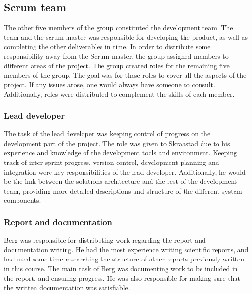 \subsection{Scrum team}
\label{subsec:process_and_methodology-project_organization-scrum_team}

The other five members of the group constituted the development team. The team and the scrum master was responsible for developing the product, as well as completing the other deliverables in time. In order to distribute some responsibility away from the Scrum master, the group assigned members to different areas of the project. The group created roles for the remaining five members of the group. The goal was for these roles to cover all the aspects of the project. If any issues arose, one would always have someone to consult. Additionally, roles were distributed to complement the skills of each member.

\subsubsection{Lead developer}
\label{subsec:process_and_methodology-project_organization-lead_developer}

The task of the lead developer was keeping control of progress on the development part of the project. The role was given to Skraastad due to his experience and knowledge of the development tools and environment. Keeping track of inter-sprint progress, version control, development planning and integration were key responsibilities of the lead developer. Additionally, he would be the link between the solutions architecture and the rest of the development team, providing more detailed descriptions and structure of the different system components.

\subsubsection{Report and documentation}
\label{subsec:process_and_methodology-project_organization-report_and_documentation}

Berg was responsible for distributing work regarding the report and documentation writing. He had the most experience writing scientific reports, and had used some time researching the structure of other reports previously written in this course. The main task of Berg was documenting work to be included in the report, and ensuring progress. He was also responsible for making sure that the written documentation was satisfiable.

